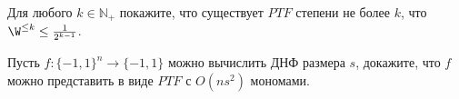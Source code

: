 \begin{ptask}{48}
    Для любого $k \in \mathbb{N}_{+}$ покажите, что существует $PTF$ степени не более $k$, что $\W^{\le k} \le
    \frac{1}{2^{k - 1}}$.
\end{ptask}

\begin{ptask}{49}
    Пусть $f: \{-1, 1\}^n \to \{-1, 1\}$ можно вычислить ДНФ размера $s$, докажите, что $f$ можно представить в виде $PTF$ с
    $O(n s^2)$ мономами.
\end{ptask}



